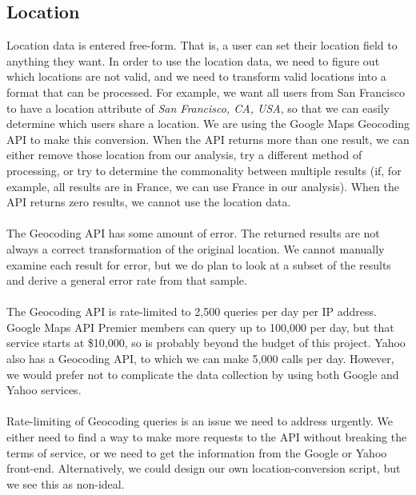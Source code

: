 \subsection{Location}
\noindent Location data is entered free-form.  That is, a user can set their location field to anything they want.  In order to use the location data, we need to figure out which locations are not valid, and we need to transform valid locations into a format that can be processed.  For example, we want all users from San Francisco to have a location attribute of \textit{San Francisco, CA, USA}, so that we can easily determine which users share a location.  We are using the Google Maps Geocoding API to make this conversion.  When the API returns more than one result, we can either remove those location from our analysis, try a different method of processing, or try to determine the commonality between multiple results (if, for example, all results are in France, we can use France in our analysis).  When the API returns zero results, we cannot use the location data.\\\\
The Geocoding API has some amount of error.  The returned results are not always a correct transformation of the original location.  We cannot manually examine each result for error, but we do plan to look at a subset of the results and derive a general error rate from that sample.\\\\
The Geocoding API is rate-limited to 2,500 queries per day per IP address.  Google Maps API Premier members can query up to 100,000 per day, but that service starts at \$10,000, so is probably beyond the budget of this project. Yahoo also has a Geocoding API, to which we can make 5,000 calls per day.  However, we would prefer not to complicate the data collection by using both Google and Yahoo services.\\\\
Rate-limiting of Geocoding queries is an issue we need to address urgently.  We either need to find a way to make more requests to the API without breaking the terms of service, or we need to get the information from the Google or Yahoo front-end.  Alternatively, we could design our own location-conversion script, but we see this as non-ideal.

